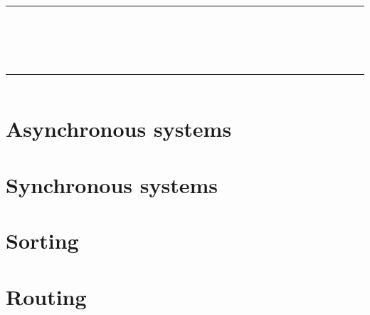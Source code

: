 \documentclass[a4paper]{article}
\title{\rule{12cm}{2pt} \vspace{5mm} \\ \Huge\firaoldstyle{Distributed algorithms:\\ a formulary} \rule{12cm}{4pt}}
\author{\Large\firalight{Mattia Setzu}}
\date{\firathin{2017}}
\begin{document}
  	\maketitle
  
  	\section{Asynchronous systems}
  	
	
  	\newpage
	
  	
	\newpage
	
  	\section{Synchronous systems}
  	
  	
  	
  	\newpage
  	
  	\section{Sorting}
  	
  	
  	\section{Routing}
  	
\end{document}
